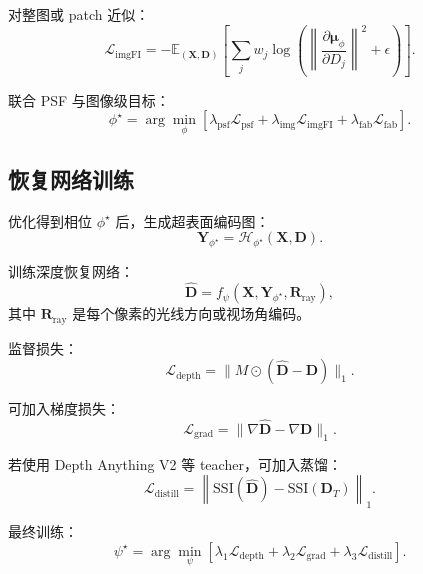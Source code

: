 \documentclass[11pt,a4paper,fontset=none]{ctexart}
\begin{document}
对整图或 patch 近似：
\begin{equation}
  \mathcal L_{\mathrm{imgFI}}
  =
  -
  \mathbb E_{(\bm X,\bm D)}
  \left[
  \sum_j
  w_j
  \log
  \left(
  \left\|
  \frac{\partial\bm\mu_\phi}{\partial D_j}
  \right\|^2
  +
  \epsilon
  \right)
  \right].
\end{equation}

联合 PSF 与图像级目标：
\begin{equation}
  \phi^\star
  =
  \arg\min_\phi
  \left[
  \lambda_{\mathrm{psf}}\mathcal L_{\mathrm{psf}}
  +
  \lambda_{\mathrm{img}}\mathcal L_{\mathrm{imgFI}}
  +
  \lambda_{\mathrm{fab}}\mathcal L_{\mathrm{fab}}
  \right].
\end{equation}

\subsection{恢复网络训练}

优化得到相位 $\phi^\star$ 后，生成超表面编码图：
\begin{equation}
  \bm Y_{\phi^\star}
  =
  \mathcal H_{\phi^\star}(\bm X,\bm D).
\end{equation}

训练深度恢复网络：
\begin{equation}
  \hat{\bm D}
  =
  f_\psi(\bm X,\bm Y_{\phi^\star},\bm R_{\mathrm{ray}}),
\end{equation}
其中 $\bm R_{\mathrm{ray}}$ 是每个像素的光线方向或视场角编码。

监督损失：
\begin{equation}
  \mathcal L_{\mathrm{depth}}
  =
  \|M\odot(\hat{\bm D}-\bm D)\|_1.
\end{equation}

可加入梯度损失：
\begin{equation}
  \mathcal L_{\mathrm{grad}}
  =
  \|\nabla\hat{\bm D}-\nabla\bm D\|_1.
\end{equation}

若使用 Depth Anything V2 等 teacher，可加入蒸馏：
\begin{equation}
  \mathcal L_{\mathrm{distill}}
  =
  \left\|
  \mathrm{SSI}(\hat{\bm D})
  -
  \mathrm{SSI}(\bm D_T)
  \right\|_1.
\end{equation}

最终训练：
\begin{equation}
  \psi^\star
  =
  \arg\min_\psi
  \left[
  \lambda_1\mathcal L_{\mathrm{depth}}
  +
  \lambda_2\mathcal L_{\mathrm{grad}}
  +
  \lambda_3\mathcal L_{\mathrm{distill}}
  \right].
\end{equation}
\end{document}
